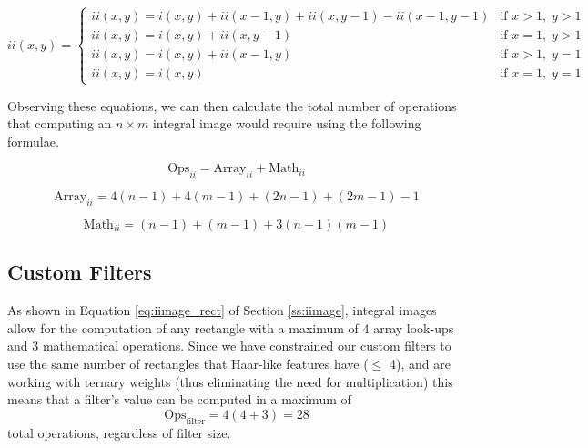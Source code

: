 \documentclass[11pt,a4paper,oldfontcommands]{memoir}
\begin{document}
\begin{equation}
    ii(x, y) = 
    \begin{cases} 
        ii(x, y) = i(x, y) + ii(x - 1, y) + ii(x, y - 1) - ii(x - 1, y - 1) & \textrm{if } x > 1, \; y > 1 \\
        ii(x, y) = i(x, y) + ii(x, y - 1) & \textrm{if } x = 1, \; y > 1 \\
        ii(x, y) = i(x, y) + ii(x - 1, y) & \textrm{if } x > 1, \; y = 1\\ 
        ii(x, y) = i(x, y) & \textrm{if } x = 1, \; y = 1 
    \end{cases}
    \label{eq:iimage_efficient_comp}
\end{equation}

Observing these equations, we can then calculate the total number of operations that computing an $n \times m$ integral image would require using the following formulae.

\begin{equation}
    \textrm{Ops}_{ii} = \textrm{Array}_{ii} + \textrm{Math}_{ii}
    \label{eq:iimage_num_ops}
\end{equation}

\begin{equation}
    \textrm{Array}_{ii} = 4(n - 1) + 4(m - 1) + (2n - 1) + (2m - 1) - 1
    \label{eq:iimage_num_arr}
\end{equation}

\begin{equation}
    \textrm{Math}_{ii} = (n - 1) + (m - 1) + 3(n - 1)(m - 1)
    \label{eq:iimage_num_math}
\end{equation}

\subsection{Custom Filters}
As shown in Equation \ref{eq:iimage_rect} of Section \ref{ss:iimage}, integral images allow for the computation of any rectangle with a maximum of 4 array look-ups and 3 mathematical operations. Since we have constrained our custom filters to use the same number of rectangles that Haar-like features have ($\leq$ 4), and are working with ternary weights (thus eliminating the need for multiplication) this means that a filter's value can be computed in a maximum of
\begin{equation}
    \textrm{Ops}_\textrm{filter} = 4(4 + 3) = 28
\end{equation}
total operations, regardless of filter size. 
\end{document}
